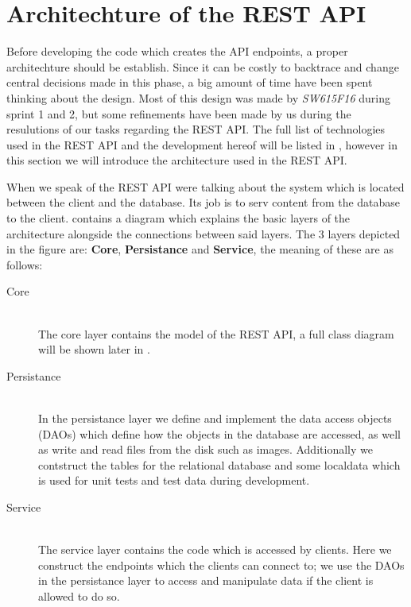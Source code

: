\section{Architechture of the REST API}
Before developing the code which creates the API endpoints, a proper architechture should be establish. 
Since it can be costly to backtrace and change central decisions made in this phase, a big amount of time have been spent thinking about the design. 
Most of this design was made by \textit{SW615F16} during sprint 1 and 2, but some refinements have been made by us during the resulutions of our tasks regarding the REST API. 
The full list of technologies used in the REST API and the development hereof will be listed in , however in this section we will introduce the architecture used in the REST API. 

When we speak of the REST API were talking about the system which is located between the client and the database.
Its job is to serv content from the database to the client. 
 contains a diagram which explains the basic layers of the architecture alongside the connections between said layers. 
The 3 layers depicted in the figure are: \textbf{Core}, \textbf{Persistance} and \textbf{Service}, the meaning of these are as follows:
\begin{description}
    \item[Core] \hfill \\
    The core layer contains the model of the REST API, a full class diagram will be shown later in .

    \item[Persistance] \hfill \\ 
    In the persistance layer we define and implement the data access objects (DAOs) which define how the objects in the database are accessed, as well as write and read files from the disk such as images. 
    Additionally we contstruct the tables for the relational database and some localdata which is used for unit tests and test data during development. 

    \item[Service] \hfill \\ 
    The service layer contains the code which is accessed by clients.
    Here we construct the endpoints which the clients can connect to; we use the DAOs in the persistance layer to access and manipulate data if the client is allowed to do so. 
\end{description}

